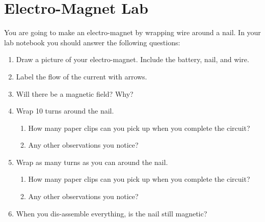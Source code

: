 \documentclass[14pt, fleqn, paper=letter, oneside]{scrartcl}
\newcommand{\maintitle}{Electro-Magnet Lab}
\begin{document}
\thispagestyle{empty}
\section*{\maintitle}
You are going to make an electro-magnet by wrapping wire around a nail.
In your lab notebook you should answer the following questions:

\begin{enumerate}[leftmargin=*]
\item Draw a picture of your electro-magnet.  Include the battery, nail, and wire.

\vfill
\item Label the flow of the current with arrows.

\vfill
\item Will there be a magnetic field? Why?

\vfill
\item Wrap 10 turns around the nail.
	\begin{enumerate}
	\item How many paper clips can you pick up when you complete the circuit?
	\vfill
	\item Any other observations you notice?
	\vfill
	\end{enumerate}

\vfill
\item Wrap as many turns as you can around the nail.
	\begin{enumerate}
	\item How many paper clips can you pick up when you complete the circuit?
	\vfill
	\item Any other observations you notice?
	\vfill
	\end{enumerate}

\vfill
\item When you dis-assemble everything, is the nail still magnetic?
\end{enumerate}
\vfill
\end{document}
